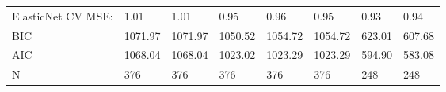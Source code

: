 \begin{table}
\begin{center}
\begin{tabular}{llllllll}
ElasticNet CV MSE:                             & 1.01    & 1.01    & 0.95     & 0.96     & 0.95     & 0.93      & 0.94     \\
BIC                                            & 1071.97 & 1071.97 & 1050.52  & 1054.72  & 1054.72  & 623.01    & 607.68   \\
AIC                                            & 1068.04 & 1068.04 & 1023.02  & 1023.29  & 1023.29  & 594.90    & 583.08   \\
N                                              & 376     & 376     & 376      & 376      & 376      & 248       & 248      \\
\hline
\end{tabular}
\end{center}
\end{table}
